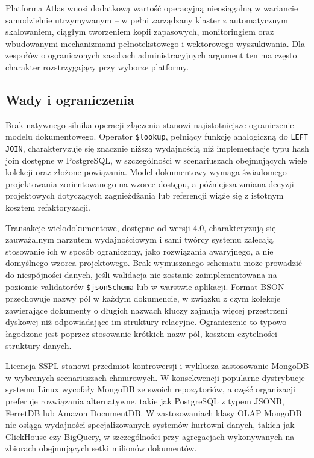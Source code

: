Platforma Atlas wnosi dodatkową wartość operacyjną nieosiągalną w wariancie
samodzielnie utrzymywanym -- w pełni zarządzany klaster z automatycznym
skalowaniem, ciągłym tworzeniem kopii zapasowych, monitoringiem oraz
wbudowanymi mechanizmami pełnotekstowego i wektorowego wyszukiwania. Dla
zespołów o ograniczonych zasobach administracyjnych argument ten ma
często charakter rozstrzygający przy wyborze platformy.

\subsection{Wady i ograniczenia}

Brak natywnego silnika operacji złączenia stanowi najistotniejsze ograniczenie
modelu dokumentowego. Operator \texttt{\$lookup}, pełniący funkcję analogiczną
do \texttt{LEFT JOIN}, charakteryzuje się znacznie niższą wydajnością niż
implementacje typu hash join dostępne w PostgreSQL, w szczególności w
scenariuszach obejmujących wiele kolekcji oraz złożone powiązania. Model
dokumentowy wymaga świadomego projektowania zorientowanego na wzorce dostępu,
a późniejsza zmiana decyzji projektowych dotyczących zagnieżdżania lub
referencji wiąże się z istotnym kosztem refaktoryzacji.

Transakcje wielodokumentowe, dostępne od wersji 4.0, charakteryzują się
zauważalnym narzutem wydajnościowym i sami twórcy systemu zalecają stosowanie
ich w sposób ograniczony, jako rozwiązania awaryjnego, a nie domyślnego wzorca
projektowego. Brak wymuszanego schematu może prowadzić do niespójności danych,
jeśli walidacja nie zostanie zaimplementowana na poziomie validatorów
\texttt{\$jsonSchema} lub w warstwie aplikacji. Format BSON przechowuje nazwy
pól w każdym dokumencie, w związku z czym kolekcje zawierające dokumenty
o długich nazwach kluczy zajmują więcej przestrzeni dyskowej niż odpowiadające
im struktury relacyjne. Ograniczenie to typowo łagodzone jest poprzez
stosowanie krótkich nazw pól, kosztem czytelności struktury danych.

Licencja SSPL stanowi przedmiot kontrowersji i wyklucza zastosowanie MongoDB
w wybranych scenariuszach chmurowych. W konsekwencji popularne dystrybucje
systemu Linux wycofały MongoDB ze swoich repozytoriów, a część organizacji
preferuje rozwiązania alternatywne, takie jak PostgreSQL z typem JSONB,
FerretDB lub Amazon DocumentDB. W zastosowaniach klasy OLAP MongoDB nie
osiąga wydajności specjalizowanych systemów hurtowni danych, takich jak
ClickHouse czy BigQuery, w szczególności przy agregacjach wykonywanych
na zbiorach obejmujących setki milionów dokumentów.

